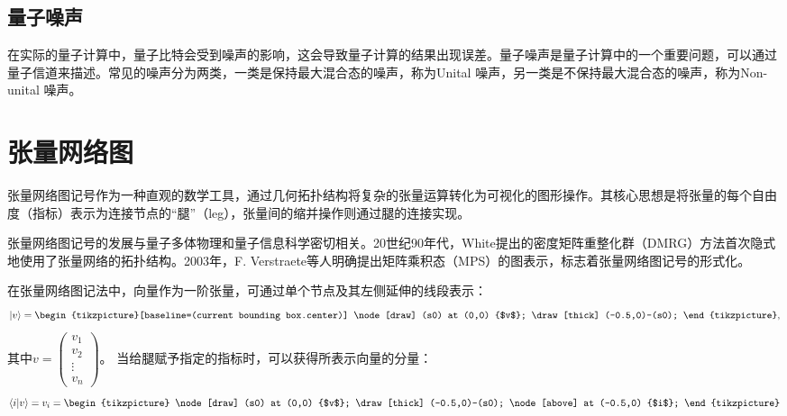 \subsection{量子噪声}
在实际的量子计算中，量子比特会受到噪声的影响，这会导致量子计算的结果出现误差。量子噪声是量子计算中的一个重要问题，可以通过量子信道来描述。常见的噪声分为两类，一类是保持最大混合态的噪声，称为Unital 噪声，另一类是不保持最大混合态的噪声，称为Non-unital 噪声。

\section{张量网络图}


张量网络图记号作为一种直观的数学工具，通过几何拓扑结构将复杂的张量运算转化为可视化的图形操作。其核心思想是将张量的每个自由度（指标）表示为连接节点的“腿”（leg），张量间的缩并操作则通过腿的连接实现。

张量网络图记号的发展与量子多体物理和量子信息科学密切相关。20世纪90年代，White提出的密度矩阵重整化群（DMRG）方法首次隐式地使用了张量网络的拓扑结构。2003年，F. Verstraete等人明确提出矩阵乘积态（MPS）的图表示，标志着张量网络图记号的形式化。


在张量网络图记法中，向量作为一阶张量，可通过单个节点及其左侧延伸的线段表示：
\begin{equation}
  \ket{v}
  =
  \begin{tikzpicture}[baseline=(current bounding box.center)]
    \node[draw] (s0) at (0,0) {$v$};
    \draw [thick] (-0.5,0)--(s0);
  \end{tikzpicture},
\end{equation}
其中$v=\begin{pmatrix} v_1 \\ v_2 \\ \vdots \\ v_n \end{pmatrix}$。
当给腿赋予指定的指标时，可以获得所表示向量的分量：
\begin{equation}
  \braket{i}{v}
  =v_i=\begin{tikzpicture}
    \node[draw] (s0) at (0,0) {$v$};
    \draw [thick] (-0.5,0)--(s0);
    \node[above] at (-0.5,0) {$i$};
  \end{tikzpicture}
\end{equation}


